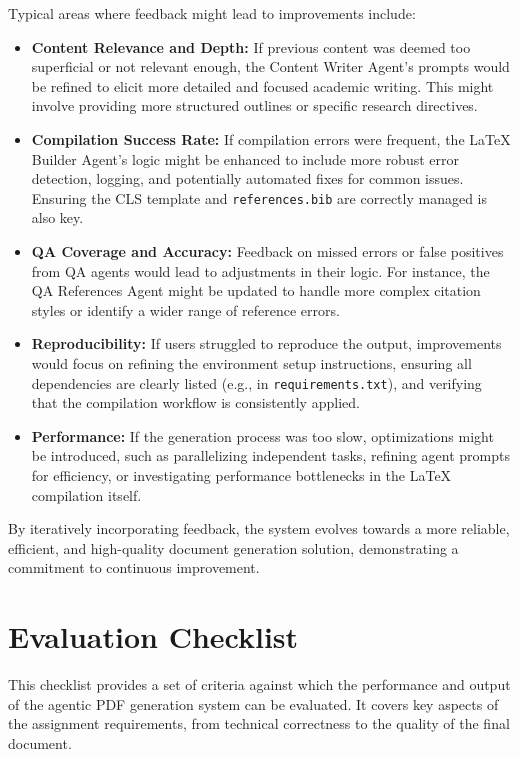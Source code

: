 \documentclass{custom-academic-template}
\begin{document}
Typical areas where feedback might lead to improvements include:
\begin{itemize}
    \item 	\textbf{Content Relevance and Depth:} If previous content was deemed too superficial or not relevant enough, the Content Writer Agent's prompts would be refined to elicit more detailed and focused academic writing. This might involve providing more structured outlines or specific research directives.
    \item 	\textbf{Compilation Success Rate:} If compilation errors were frequent, the LaTeX Builder Agent's logic might be enhanced to include more robust error detection, logging, and potentially automated fixes for common issues. Ensuring the CLS template and 	\texttt{references.bib} are correctly managed is also key.
    \item 	\textbf{QA Coverage and Accuracy:} Feedback on missed errors or false positives from QA agents would lead to adjustments in their logic. For instance, the QA References Agent might be updated to handle more complex citation styles or identify a wider range of reference errors.
    \item 	\textbf{Reproducibility:} If users struggled to reproduce the output, improvements would focus on refining the environment setup instructions, ensuring all dependencies are clearly listed (e.g., in 	\texttt{requirements.txt}), and verifying that the compilation workflow is consistently applied.
    \item 	\textbf{Performance:} If the generation process was too slow, optimizations might be introduced, such as parallelizing independent tasks, refining agent prompts for efficiency, or investigating performance bottlenecks in the LaTeX compilation itself.
\end{itemize}
By iteratively incorporating feedback, the system evolves towards a more reliable, efficient, and high-quality document generation solution, demonstrating a commitment to continuous improvement.

\section{Evaluation Checklist}
This checklist provides a set of criteria against which the performance and output of the agentic PDF generation system can be evaluated. It covers key aspects of the assignment requirements, from technical correctness to the quality of the final document.
\end{document}
